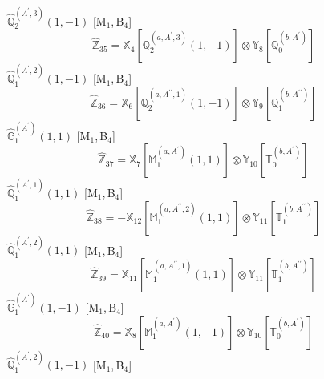 \documentclass[fleqn,10pt,landscape]{article}
\begin{document}
\begin{itemize}
\begin{dmath*}
\end{dmath*}
\vspace{4mm}
\noindent {} $\,\,\,\hat{\mathbb{Q}}_{2}^{(A^{\prime},3)}(1,-1)$ [M$_{1}$,\,B$_{4}$]
\begin{dmath*}
\hat{\mathbb{Z}}_{35}=\mathbb{X}_{4}[\mathbb{Q}_{2}^{(a,A^{\prime},3)}(1,-1)] \otimes\mathbb{Y}_{8}[\mathbb{Q}_{0}^{(b,A^{\prime})}]
\end{dmath*}
\vspace{4mm}
\noindent {} $\,\,\,\hat{\mathbb{Q}}_{1}^{(A^{\prime},2)}(1,-1)$ [M$_{1}$,\,B$_{4}$]
\begin{dmath*}
\hat{\mathbb{Z}}_{36}=\mathbb{X}_{6}[\mathbb{Q}_{2}^{(a,A^{\prime\prime},1)}(1,-1)] \otimes\mathbb{Y}_{9}[\mathbb{Q}_{1}^{(b,A^{\prime\prime})}]
\end{dmath*}
\vspace{4mm}
\noindent {} $\,\,\,\hat{\mathbb{G}}_{1}^{(A^{\prime})}(1,1)$ [M$_{1}$,\,B$_{4}$]
\begin{dmath*}
\hat{\mathbb{Z}}_{37}=\mathbb{X}_{7}[\mathbb{M}_{1}^{(a,A^{\prime})}(1,1)] \otimes\mathbb{Y}_{10}[\mathbb{T}_{0}^{(b,A^{\prime})}]
\end{dmath*}
\vspace{4mm}
\noindent {} $\,\,\,\hat{\mathbb{Q}}_{1}^{(A^{\prime},1)}(1,1)$ [M$_{1}$,\,B$_{4}$]
\begin{dmath*}
\hat{\mathbb{Z}}_{38}=- \mathbb{X}_{12}[\mathbb{M}_{1}^{(a,A^{\prime\prime},2)}(1,1)] \otimes\mathbb{Y}_{11}[\mathbb{T}_{1}^{(b,A^{\prime\prime})}]
\end{dmath*}
\vspace{4mm}
\noindent {} $\,\,\,\hat{\mathbb{Q}}_{1}^{(A^{\prime},2)}(1,1)$ [M$_{1}$,\,B$_{4}$]
\begin{dmath*}
\hat{\mathbb{Z}}_{39}=\mathbb{X}_{11}[\mathbb{M}_{1}^{(a,A^{\prime\prime},1)}(1,1)] \otimes\mathbb{Y}_{11}[\mathbb{T}_{1}^{(b,A^{\prime\prime})}]
\end{dmath*}
\vspace{4mm}
\noindent {} $\,\,\,\hat{\mathbb{G}}_{1}^{(A^{\prime})}(1,-1)$ [M$_{1}$,\,B$_{4}$]
\begin{dmath*}
\hat{\mathbb{Z}}_{40}=\mathbb{X}_{8}[\mathbb{M}_{1}^{(a,A^{\prime})}(1,-1)] \otimes\mathbb{Y}_{10}[\mathbb{T}_{0}^{(b,A^{\prime})}]
\end{dmath*}
\vspace{4mm}
\noindent {} $\,\,\,\hat{\mathbb{Q}}_{1}^{(A^{\prime},2)}(1,-1)$ [M$_{1}$,\,B$_{4}$]
\begin{dmath*}

\end{dmath*}
\end{itemize}
\end{document}
